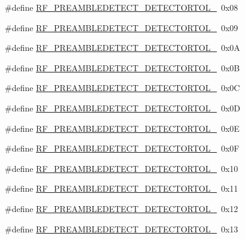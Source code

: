 \begin{DoxyCompactItemize}
\#define \mbox{\hyperlink{sx1276_regs-_fsk_8h_adb359b6eb996d119489f7d6afedc77a8}{R\+F\+\_\+\+P\+R\+E\+A\+M\+B\+L\+E\+D\+E\+T\+E\+C\+T\+\_\+\+D\+E\+T\+E\+C\+T\+O\+R\+T\+O\+L\+\_}}~0x08
\item 
\#define \mbox{\hyperlink{sx1276_regs-_fsk_8h_a8fe78c9fcf3aa09f5aa1831ba3c33b7a}{R\+F\+\_\+\+P\+R\+E\+A\+M\+B\+L\+E\+D\+E\+T\+E\+C\+T\+\_\+\+D\+E\+T\+E\+C\+T\+O\+R\+T\+O\+L\+\_}}~0x09
\item 
\#define \mbox{\hyperlink{sx1276_regs-_fsk_8h_ab7c305fbd95c7da0279d01830ca33de2}{R\+F\+\_\+\+P\+R\+E\+A\+M\+B\+L\+E\+D\+E\+T\+E\+C\+T\+\_\+\+D\+E\+T\+E\+C\+T\+O\+R\+T\+O\+L\+\_}}~0x0A
\item 
\#define \mbox{\hyperlink{sx1276_regs-_fsk_8h_ad65f1522c16c3d28b2ee4b8f0742962c}{R\+F\+\_\+\+P\+R\+E\+A\+M\+B\+L\+E\+D\+E\+T\+E\+C\+T\+\_\+\+D\+E\+T\+E\+C\+T\+O\+R\+T\+O\+L\+\_}}~0x0B
\item 
\#define \mbox{\hyperlink{sx1276_regs-_fsk_8h_a7d2f3b00426a551c8ae401881717dcca}{R\+F\+\_\+\+P\+R\+E\+A\+M\+B\+L\+E\+D\+E\+T\+E\+C\+T\+\_\+\+D\+E\+T\+E\+C\+T\+O\+R\+T\+O\+L\+\_}}~0x0C
\item 
\#define \mbox{\hyperlink{sx1276_regs-_fsk_8h_ab4eac0c4501804c8c5c9a3b7634ea151}{R\+F\+\_\+\+P\+R\+E\+A\+M\+B\+L\+E\+D\+E\+T\+E\+C\+T\+\_\+\+D\+E\+T\+E\+C\+T\+O\+R\+T\+O\+L\+\_}}~0x0D
\item 
\#define \mbox{\hyperlink{sx1276_regs-_fsk_8h_a1699af63f8c2a4aafc0b0b3545de7caf}{R\+F\+\_\+\+P\+R\+E\+A\+M\+B\+L\+E\+D\+E\+T\+E\+C\+T\+\_\+\+D\+E\+T\+E\+C\+T\+O\+R\+T\+O\+L\+\_}}~0x0E
\item 
\#define \mbox{\hyperlink{sx1276_regs-_fsk_8h_ad13b9c3f0b1ba1eea748751f8cff07e0}{R\+F\+\_\+\+P\+R\+E\+A\+M\+B\+L\+E\+D\+E\+T\+E\+C\+T\+\_\+\+D\+E\+T\+E\+C\+T\+O\+R\+T\+O\+L\+\_}}~0x0F
\item 
\#define \mbox{\hyperlink{sx1276_regs-_fsk_8h_aad1ba5659a47a05311fc9165df1df0c7}{R\+F\+\_\+\+P\+R\+E\+A\+M\+B\+L\+E\+D\+E\+T\+E\+C\+T\+\_\+\+D\+E\+T\+E\+C\+T\+O\+R\+T\+O\+L\+\_}}~0x10
\item 
\#define \mbox{\hyperlink{sx1276_regs-_fsk_8h_a79fe78ed30bace2a4a4dc589bb5277fc}{R\+F\+\_\+\+P\+R\+E\+A\+M\+B\+L\+E\+D\+E\+T\+E\+C\+T\+\_\+\+D\+E\+T\+E\+C\+T\+O\+R\+T\+O\+L\+\_}}~0x11
\item 
\#define \mbox{\hyperlink{sx1276_regs-_fsk_8h_ad969caed7162a965ea9c8469d45c42dd}{R\+F\+\_\+\+P\+R\+E\+A\+M\+B\+L\+E\+D\+E\+T\+E\+C\+T\+\_\+\+D\+E\+T\+E\+C\+T\+O\+R\+T\+O\+L\+\_}}~0x12
\item 
\#define \mbox{\hyperlink{sx1276_regs-_fsk_8h_a6295b4fba95341315d256126bdb6506d}{R\+F\+\_\+\+P\+R\+E\+A\+M\+B\+L\+E\+D\+E\+T\+E\+C\+T\+\_\+\+D\+E\+T\+E\+C\+T\+O\+R\+T\+O\+L\+\_}}~0x13

\end{DoxyCompactItemize}
